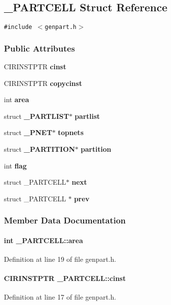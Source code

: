 \subsection{\_\-PARTCELL  Struct Reference}
\label{_PARTCELL}
{\tt \#include $<$genpart.h$>$}

\subsubsection*{Public Attributes}
\begin{CompactItemize}
\item 
CIRINSTPTR {\bf cinst}
\item 
CIRINSTPTR {\bf copycinst}
\item 
int {\bf area}
\item 
struct {\bf \_\-PARTLIST}$\ast$ {\bf partlist}
\item 
struct {\bf \_\-PNET}$\ast$ {\bf topnets}
\item 
struct {\bf \_\-PARTITION}$\ast$ {\bf partition}
\item 
int {\bf flag}
\item 
struct \_\-PARTCELL$\ast$ {\bf next}
\item 
struct \_\-PARTCELL $\ast$ {\bf prev}
\end{CompactItemize}


\subsubsection{Member Data Documentation}
\label{_PARTCELL_m2}
\paragraph{\setlength{\rightskip}{0pt plus 5cm}int \_\-PARTCELL::area}\hfill



Definition at line 19 of file genpart.h.\label{_PARTCELL_m0}
\paragraph{\setlength{\rightskip}{0pt plus 5cm}CIRINSTPTR \_\-PARTCELL::cinst}\hfill



Definition at line 17 of file genpart.h.\label{_PARTCELL_m1}
